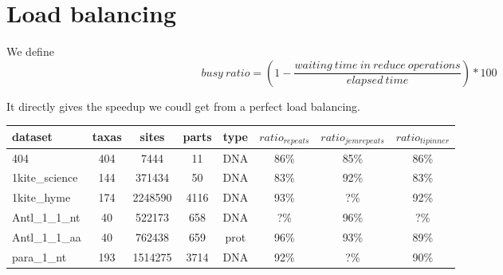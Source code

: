 \documentclass[a4paper]{article}
\begin{document}
\section{Load balancing}

We define
$$busy\ ratio = (1 - \frac{waiting\ time\ in\ reduce\ operations}{elapsed\ time}) * 100$$

It directly gives the speedup we coudl get from a perfect load balancing.

\begin{tabular}{|l|c|c|c|c|c|c|c|}
\hline dataset                    & taxas & sites    & parts & type  & $ratio_{repeats}$ & $ratio_{jemrepeats}$ & $ratio_{tipinner}$\\
\hline 404                        & 404   &  7444    & 11    & DNA  & 86\%     & 85\%   & 86\%  \\
\hline 1kite\_science             & 144   &  371434  & 50    & DNA  & 83\%     & 92\%    & 83\%  \\
\hline 1kite\_hyme                & 174   &  2248590 & 4116  & DNA  & 93\%     & ?\%    & 92\%  \\
\hline Antl\_1\_1\_nt             & 40    &  522173  & 658   & DNA  & ?\%      & 96\%    & ?\%  \\
\hline Antl\_1\_1\_aa             & 40    &  762438  & 659   & prot & 96\%     & 93\%    & 89\%  \\
\hline para\_1\_nt                & 193   &  1514275 & 3714  & DNA  & 92\%     & ?\%    & 90\%  \\
\hline 
\end{tabular}\newline
\newline


\end{document}
